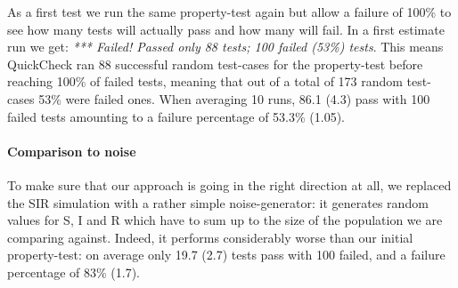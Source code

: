 As a first test we run the same property-test again but allow a failure of 100\% to see how many tests will actually pass and how many will fail. In a first estimate run we get: \textit{*** Failed! Passed only 88 tests; 100 failed (53\%) tests}. This means QuickCheck ran 88 successful random test-cases for the property-test before reaching 100\% of failed tests, meaning that out of a total of 173 random test-cases 53\% were failed ones. When averaging 10 runs, 86.1 (4.3) pass with 100 failed tests amounting to a failure percentage of 53.3\% (1.05).

\paragraph{Comparison to noise}
To make sure that our approach is going in the right direction at all, we replaced the SIR simulation with a rather simple noise-generator: it generates random values for S, I and R which have to sum up to the size of the population we are comparing against. Indeed, it performs considerably worse than our initial property-test: on average only 19.7 (2.7) tests pass with 100 failed, and a failure percentage of 83\% (1.7). 

%

